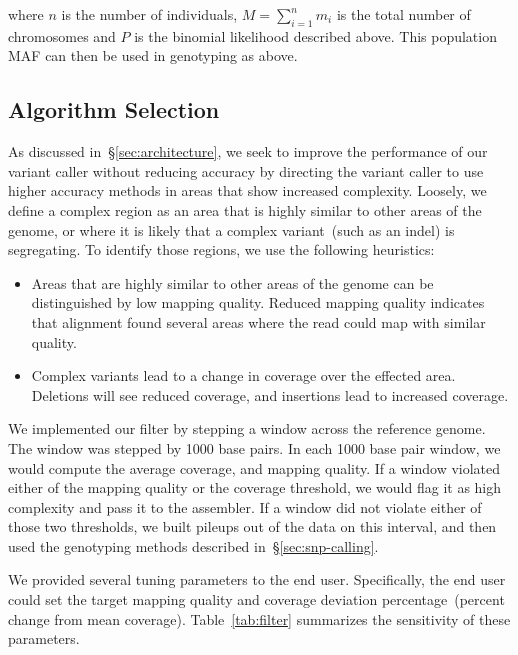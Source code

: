 \documentclass{acm_proc_article-sp}
\begin{document}
 where $n$ is the number of individuals, $M=\sum_{i=1}^nm_i$ is the total number of chromosomes and $P$ is the binomial
 likelihood described above. This population MAF can then be used in genotyping as above. 


\subsection{Algorithm Selection}
\label{sec:algorithm-selection}


As discussed in~\S\ref{sec:architecture}, we seek to improve the performance of our variant caller without reducing accuracy by directing
the variant caller to use higher accuracy methods in areas that show increased complexity. Loosely, we define a complex region as an
area that is highly similar to other areas of the genome, or where it is likely that a complex variant~(such as an indel) is segregating. To
identify those regions, we use the following heuristics:

\begin{itemize}
\item Areas that are highly similar to other areas of the genome can be distinguished by low mapping quality. Reduced mapping quality
indicates that alignment found several areas where the read could map with similar quality.
\item Complex variants lead to a change in coverage over the effected area. Deletions will see reduced coverage, and insertions lead
to increased coverage.
\end{itemize}

We implemented our filter by stepping a window across the reference genome. The window was stepped by 1000 base pairs. In each
1000 base pair window, we would compute the average coverage, and mapping quality. If a window violated either of the mapping
quality or the coverage threshold, we would flag it as high complexity and pass it to the assembler. If a window did not violate either
of those two thresholds, we built pileups out of the data on this interval, and then used the genotyping methods described
in~\S\ref{sec:snp-calling}.

We provided several tuning parameters to the end user. Specifically, the end user could set the target mapping quality and coverage
deviation percentage~(percent change from mean coverage). Table~\ref{tab:filter} summarizes the sensitivity of these parameters.
\end{document}
